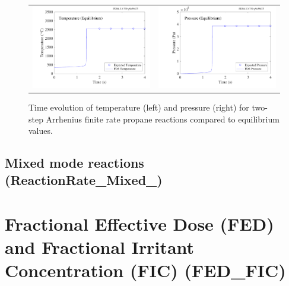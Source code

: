\documentclass[11pt]{book}
\begin{document}
\begin{figure}[ht]
\begin{tabular*}{\textwidth}{lr}
\includegraphics[width=3.2in]{SCRIPT_FIGURES/ReactionRate_Equilibrium_Temperature} &
\includegraphics[width=3.2in]{SCRIPT_FIGURES/ReactionRate_Equilibrium_Pressure}
\end{tabular*}
\caption[Temperature and Pressure equilibrium comparison]{Time evolution of temperature (left) and pressure (right) for two-step Arrhenius finite rate propane reactions compared to equilibrium values.}
\label{fig:Arrhenius_175Order_23stepb}
\end{figure}
\subsection{Mixed mode reactions (ReactionRate\_Mixed\_)}




\clearpage

\section{Fractional Effective Dose (FED) and Fractional Irritant Concentration (FIC) (\texorpdfstring{{\bf FED\_FIC}}{FED\_FIC}) }
\label{FED_FIC}
\end{document}
